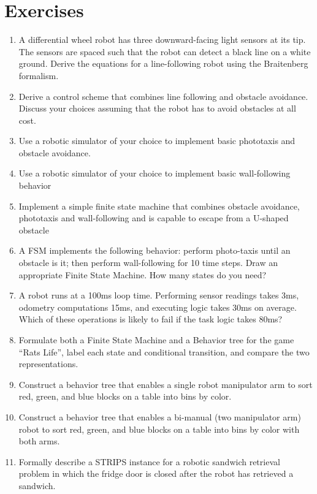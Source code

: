 \section*{Exercises}

\begin{enumerate}
\item A differential wheel robot has three downward-facing light sensors at its tip. The sensors are spaced such that the robot can detect a black line on a white ground. Derive the equations for a line-following robot using the Braitenberg formalism.
\item Derive a control scheme that combines line following and obstacle avoidance. Discuss your choices assuming that the robot has to avoid obstacles at all cost.
\item Use a robotic simulator of your choice to implement basic phototaxis and obstacle avoidance.
\item Use a robotic simulator of your choice to implement basic wall-following behavior
\item Implement a simple finite state machine that combines obstacle avoidance, phototaxis and wall-following and is capable to escape from a U-shaped obstacle
\item A FSM implements the following behavior: perform photo-taxis until an obstacle is it; then perform wall-following for 10 time steps. Draw an appropriate Finite State Machine. How many states do you need?
\item A robot runs at a 100ms loop time. Performing sensor readings takes 3ms, odometry computations 15ms, and executing logic takes 30ms on average. Which of these operations is likely to fail if the task logic takes 80ms?
\item Formulate both a Finite State Machine and a Behavior tree for the game ``Rats Life'', label each state and conditional transition, and compare the two representations.
\item Construct a behavior tree that enables a single robot manipulator arm to sort red, green, and blue blocks on a table into bins by color.
\item Construct a behavior tree that enables a bi-manual (two manipulator arm) robot to sort red, green, and blue blocks on a table into bins by color with both arms.
\item Formally describe a STRIPS instance for a robotic sandwich retrieval problem in which the fridge door is closed after the robot has retrieved a sandwich. 
\end{enumerate}
